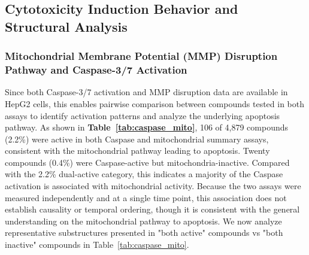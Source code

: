 \documentclass[letterpaper]{article}
\begin{document}


\subsection{Cytotoxicity Induction Behavior and Structural Analysis}
\subsubsection{Mitochondrial Membrane Potential (MMP) Disruption Pathway and Caspase-3/7 Activation}

Since both Caspase-3/7 activation and MMP disruption data are available in HepG2 cells, this enables pairwise comparison between compounds tested in both assays to identify activation patterns and analyze the underlying apoptosis pathway. As shown in \textbf{Table~\ref{tab:caspase_mito}}, 106 of 4,879 compounds (2.2\%) were active in both Caspase and mitochondrial summary assays, consistent with the mitochondrial pathway leading to apoptosis. Twenty compounds (0.4\%) were Caspase-active but mitochondria-inactive. Compared with the 2.2\% dual-active category, this indicates a majority of the Caspase activation is associated with mitochondrial activity. Because the two assays were measured independently and at a single time point, this association does not establish causality or temporal ordering, though it is consistent with the general understanding on the mitochondrial pathway to apoptosis.  We now analyze representative substructures presented in "both active" compounds vs "both inactive" compounds in Table~\ref{tab:caspase_mito}.
\end{document}
